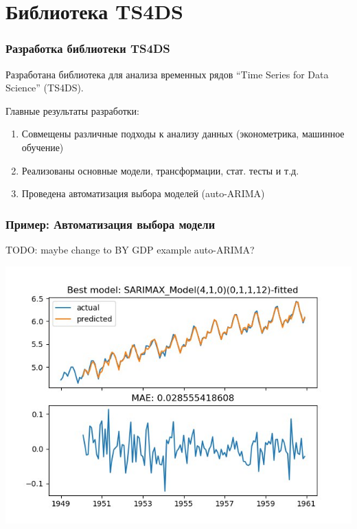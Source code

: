 \documentclass{beamer}
\begin{document}
	\section{Библиотека TS4DS}
		\begin{frame}
			\frametitle{Разработка библиотеки TS4DS}
			
			Разработана библиотека для анализа временных рядов ``Time Series for Data Science'' (TS4DS). 
			
			Главные результаты разработки:
			\begin{enumerate}
				\item Совмещены различные подходы к анализу данных (эконометрика, машинное обучение)
				\item Реализованы основные модели, трансформации, стат. тесты и т.д.
				\item Проведена автоматизация выбора моделей (auto-ARIMA)
			\end{enumerate}
		\end{frame}
		
		\begin{frame}
			\frametitle{Пример: Автоматизация выбора модели}
				
			TODO: maybe change to BY GDP example auto-ARIMA?
			
			\includegraphics[height=0.8\textheight]{auto_sarimax}
		\end{frame}
\end{document}
